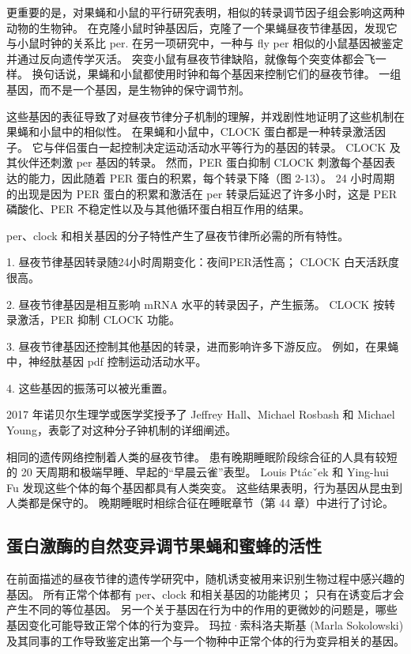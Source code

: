 更重要的是，对果蝇和小鼠的平行研究表明，相似的转录调节因子组会影响这两种动物的生物钟。 在克隆小鼠时钟基因后，克隆了一个果蝇昼夜节律基因，发现它与小鼠时钟的关系比 per. 在另一项研究中，一种与 fly per 相似的小鼠基因被鉴定并通过反向遗传学灭活。 突变小鼠有昼夜节律缺陷，就像每个突变体都会飞一样。 换句话说，果蝇和小鼠都使用时钟和每个基因来控制它们的昼夜节律。 一组基因，而不是一个基因，是生物钟的保守调节剂。

这些基因的表征导致了对昼夜节律分子机制的理解，并戏剧性地证明了这些机制在果蝇和小鼠中的相似性。 在果蝇和小鼠中，CLOCK 蛋白都是一种转录激活因子。 它与伴侣蛋白一起控制决定运动活动水平等行为的基因的转录。 CLOCK 及其伙伴还刺激 per 基因的转录。 然而，PER 蛋白抑制 CLOCK 刺激每个基因表达的能力，因此随着 PER 蛋白的积累，每个转录下降（图 2-13）。 24 小时周期的出现是因为 PER 蛋白的积累和激活在 per 转录后延迟了许多小时，这是 PER 磷酸化、PER 不稳定性以及与其他循环蛋白相互作用的结果。

per、clock 和相关基因的分子特性产生了昼夜节律所必需的所有特性。

1. 昼夜节律基因转录随24小时周期变化：夜间PER活性高； CLOCK 白天活跃度很高。

2. 昼夜节律基因是相互影响 mRNA 水平的转录因子，产生振荡。 CLOCK 按转录激活，PER 抑制 CLOCK 功能。

3. 昼夜节律基因还控制其他基因的转录，进而影响许多下游反应。 例如，在果蝇中，神经肽基因 pdf 控制运动活动水平。

4. 这些基因的振荡可以被光重置。

2017 年诺贝尔生理学或医学奖授予了 Jeffrey Hall、Michael Rosbash 和 Michael Young，表彰了对这种分子钟机制的详细阐述。

相同的遗传网络控制着人类的昼夜节律。 患有晚期睡眠阶段综合征的人具有较短的 20 天周期和极端早睡、早起的“早晨云雀”表型。 Louis Ptácˇek 和 Ying-hui Fu 发现这些个体的每个基因都具有人类突变。 这些结果表明，行为基因从昆虫到人类都是保守的。 晚期睡眠时相综合征在睡眠章节（第 44 章）中进行了讨论。

\subsection{蛋白激酶的自然变异调节果蝇和蜜蜂的活性}
在前面描述的昼夜节律的遗传学研究中，随机诱变被用来识别生物过程中感兴趣的基因。 所有正常个体都有 per、clock 和相关基因的功能拷贝； 只有在诱变后才会产生不同的等位基因。 另一个关于基因在行为中的作用的更微妙的问题是，哪些基因变化可能导致正常个体的行为变异。 玛拉·索科洛夫斯基 (Marla Sokolowski) 及其同事的工作导致鉴定出第一个与一个物种中正常个体的行为变异相关的基因。

